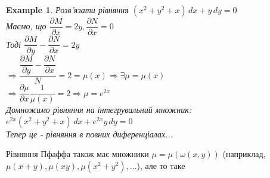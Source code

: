 \documentclass[a4paper, 10pt]{article}
\theoremstyle{theoremdd}
\theoremstyle{theoremdd}
\theoremstyle{theoremdd}
\theoremstyle{theoremdd}
\newtheorem{example}[theorem]{Example}
\theoremstyle{theoremdd}
\theoremstyle{theoremdd}
\theoremstyle{theoremdd}
\theoremstyle{theoremdd}
\begin{document}
\begin{example}
 Розв'язати рівняння $(x^2+y^2+x)\,dx + y\,dy = 0$\\
Маємо, що $\dfrac{\partial M}{\partial x} = 2y, \dfrac{\partial N}{\partial x} = 0$\\
Тоді $\dfrac{\partial M}{\partial y} - \dfrac{\partial N}{\partial x} = 2y$\\
$\Rightarrow \dfrac{\dfrac{\partial M}{\partial y} - \dfrac{\partial N}{\partial x}}{N} = 2 = \mu(x) \Rightarrow \exists \mu = \mu(x)$\\
$\Rightarrow \dfrac{\partial \mu}{\partial x} \dfrac{1}{\mu (x)} = 2 \Rightarrow \mu = e^{2x}$\\
Домножимо рівняння на інтегрувальний множник:\\
$e^{2x}(x^2+y^2+x)\,dx + e^{2x}y\,dy = 0$\\
Тепер це - рівняння в повних диференціалах...
\end{example}

Рівняння Пфаффа також має множники $\mu = \mu(\omega(x,y))$ (наприклад, \\ $\mu(x+y), \mu(xy), \mu(x^2+y^2),\dots$), але то таке
\end{document}
